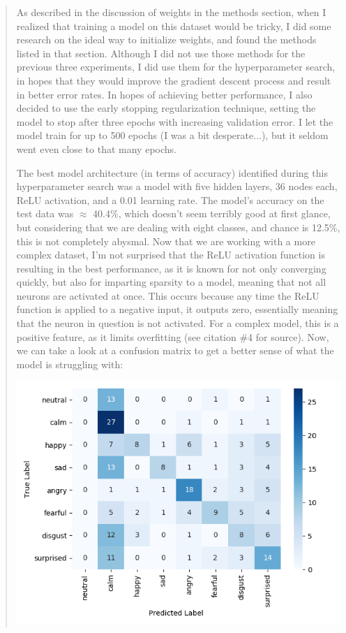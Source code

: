 \documentclass{article}
\begin{document}
\begin{quote}
	As described in the discussion of weights in the methods section, when I realized that training a model on this dataset would be tricky, I did some research on the ideal way to initialize weights, and found the methods listed in that section. Although I did not use those methods for the previous three experiments, I did use them for the hyperparameter search, in hopes that they would improve the gradient descent process and result in better error rates. In hopes of achieving better performance, I also decided to use the early stopping regularization technique, setting the model to stop after three epochs with increasing validation error. I let the model train for up to 500 epochs (I was a bit desperate...), but it seldom went even close to that many epochs.
	
	The best model architecture (in terms of accuracy) identified during this hyperparameter search was a model with five hidden layers, 36 nodes each, ReLU activation, and a 0.01 learning rate. The model's accuracy on the test data was $\approx$ 40.4\%, which doesn't seem terribly good at first glance, but considering that we are dealing with eight classes, and chance is 12.5\%, this is not completely abysmal. Now that we are working with a more complex dataset, I'm not surprised that the ReLU activation function is resulting in the best performance, as it is known for not only converging quickly, but also for imparting sparsity to a model, meaning that not all neurons are activated at once. This occurs because any time the ReLU function is applied to a negative input, it outputs zero, essentially meaning that the neuron in question is not activated. For a complex model, this is a positive feature, as it limits overfitting (see citation \#4 for source). Now, we can take a look at a confusion matrix to get a better sense of what the model is struggling with:
	
	\begin{center}
		\includegraphics[scale=0.5]{figs/Emotions_Initial_Best_Conf.png}
	\end{center}
	

\end{quote}
\end{document}

